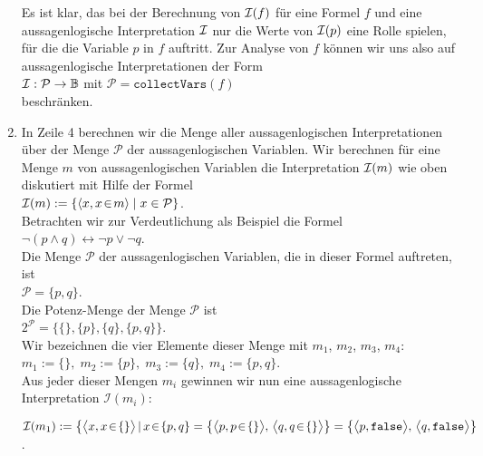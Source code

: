 \begin{enumerate}
      Es ist klar, das bei der Berechnung von ${\cal I}(f)$ f\"{u}r eine Formel $f$
      und eine aussagenlogische Interpretation ${\cal I}$ nur die Werte von
      ${\cal I}(p)$ eine Rolle spielen, f\"{u}r die die Variable $p$ in $f$
      auftritt.  Zur Analyse von $f$ k\"{o}nnen wir uns also auf aussagenlogische 
      Interpretationen  der Form \\[0.2cm]
      \hspace*{1.3cm} 
      ${\cal I}:\mathcal{P} \rightarrow \mathbb{B}$ \quad mit \quad $\mathcal{P} = \mathtt{collectVars}(f)$ 
      \\[0.2cm]
      beschr\"{a}nken.
\item In Zeile 4 berechnen wir die Menge aller aussagenlogischen
      Interpretationen \"{u}ber der Menge $\mathcal{P}$ der aussagenlogischen Variablen.  
      Wir berechnen f\"{u}r eine Menge $m$ von aussagenlogischen Variablen
      die Interpretation ${\cal I}(m)$ wie oben diskutiert mit Hilfe der Formel
      \\[0.2cm]
      \hspace*{1.3cm}
      ${\cal I}(m) := \{ \pair(x, x \!\in\! m) \mid x \in \mathcal{P} \}$.  
      \\[0.2cm]
      Betrachten wir zur Verdeutlichung als Beispiel die Formel \\[0.2cm]
      \hspace*{1.3cm} $\neg (p \wedge q) \leftrightarrow \neg p \vee \neg q$. \\[0.2cm]
      Die Menge $\mathcal{P}$ der aussagenlogischen Variablen, die in dieser Formel auftreten,
      ist \\[0.2cm]
      \hspace*{1.3cm} $\mathcal{P} = \{ p, q \}$. \\[0.2cm]
      Die Potenz-Menge der Menge $\mathcal{P}$ ist \\[0.2cm]
      \hspace*{1.3cm} $2^\mathcal{P} = \bigl\{ \{\}, \{p\}, \{q\}, \{p,q\} \bigr\}$. \\[0.2cm]
      Wir bezeichnen die vier Elemente dieser Menge mit $m_1$, $m_2$, $m_3$, $m_4$: \\[0.2cm]
      \hspace*{1.3cm} $m_1 := \{\},\; m_2 :=\{p\},\; m_3 :=\{q\},\; m_4 :=\{p,q\}$. \\[0.2cm]
      Aus jeder dieser Mengen $m_i$ gewinnen wir nun eine aussagenlogische Interpretation 
      $\mathcal{I}(m_i)$: 

      ${\cal I}(m_1) := \bigl\{ \bigl\langle x, x \!\in\! \{\} \bigl\rangle\, |\, x \!\in\! \{p,q\} = \bigl\{ \bigl\langle p, p \!\in\! \{\} \bigl\rangle,\, \bigl\langle q, q \!\in\! \{\} \bigl\rangle \bigr\} = \bigl\{ \bigl\langle p, \mathtt{false} \bigl\rangle,\, \bigl\langle q, \mathtt{false} \bigl\rangle \bigr\}$.


\end{enumerate}
